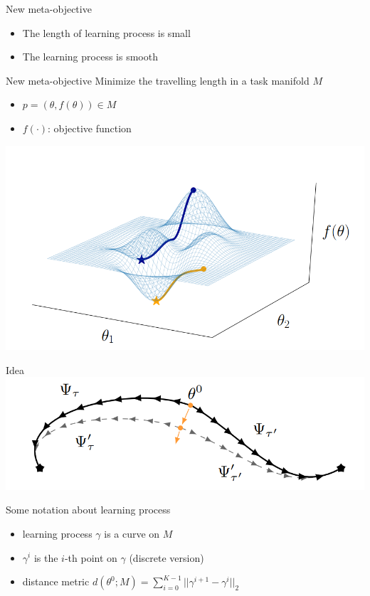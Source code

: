 \documentclass{beamer}
\begin{document}
\begin{frame}{New meta-objective}
  \begin{itemize}
    \item The length of learning process is small
    \item The learning process is smooth
  \end{itemize}

\end{frame}

\begin{frame}{New meta-objective}
  Minimize the travelling length in a task manifold $M$

  \begin{itemize}
    \item $p = (\theta,f(\theta)) \in M$
    \item $f(\cdot)$: objective function
  \end{itemize}
  \center \includegraphics[width=0.7 \textwidth]{fig/p1-manifold.png}
\end{frame}

\begin{frame}{Idea}
\center \includegraphics[width = \textwidth]{fig/p1-idea.png}
\end{frame}


\begin{frame}{Some notation about learning process}
  \begin{itemize}
    \item learning process $\gamma$ is a curve on $M$
    \item $\gamma^i$ is the $i$-th point on $\gamma$ (discrete version)
    \item distance metric $d(\theta^0;M) = \sum_{i=0}^{K-1} ||\gamma^{i+1} - \gamma^i||_2$
  \end{itemize}
\end{frame}
\end{document}
